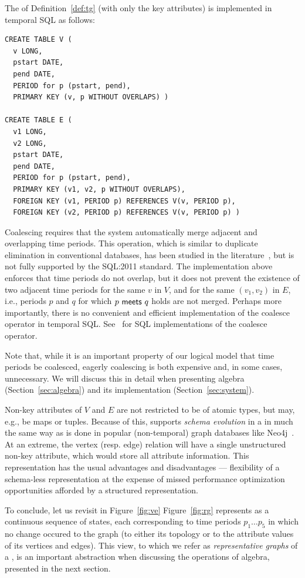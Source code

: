 The \tg of Definition~\ref{def:tg} (with only the key attributes) is
implemented in temporal SQL as follows:

\begin{small}
\begin{verbatim}
CREATE TABLE V (
  v LONG,
  pstart DATE,
  pend DATE,
  PERIOD for p (pstart, pend),
  PRIMARY KEY (v, p WITHOUT OVERLAPS) )

CREATE TABLE E (
  v1 LONG,
  v2 LONG,
  pstart DATE,
  pend DATE,
  PERIOD for p (pstart, pend),
  PRIMARY KEY (v1, v2, p WITHOUT OVERLAPS),
  FOREIGN KEY (v1, PERIOD p) REFERENCES V(v, PERIOD p),
  FOREIGN KEY (v2, PERIOD p) REFERENCES V(v, PERIOD p) )
\end{verbatim}
\end{small}

Coalescing requires that the system automatically merge adjacent and
overlapping time periods.  This operation, which is similar to
duplicate elimination in conventional databases, has been studied in
the
literature~\cite{DBLP:conf/vldb/BohlenSS96,DBLP:journals/sigmod/Zimanyi06},
but is not fully supported by the SQL:2011 standard.  The
implementation above enforces that time periods do not overlap, but it
does not prevent the existence of two adjacent time periods for the
same $v$ in $V$, and for the same $(v_1, v_2)$ in $E$, i.e., periods
$p$ and $q$ for which $p~\mathsf{meets}~q$ holds are not merged.
Perhaps more importantly, there is no convenient and efficient
implementation of the coalesce operator in temporal SQL.
See~\cite{DBLP:reference/db/Bohlen09} for SQL implementations of the
coalesce operator.

Note that, while it is an important property of our logical model that
time periods be coalesced, eagerly coalescing is both expensive and,
in some cases, unnecessary.  We will discuss this in detail when
presenting \tg algebra (Section~\ref{sec:algebra}) and its
implementation (Section~\ref{sec:system}).

Non-key attributes of $V$ and $E$ are not restricted to be of atomic
types, but may, e.g., be maps or tuples.  Because of this, \ql
supports {\em schema evolution} in a \tg in much the same way as is
done in popular (non-temporal) graph databases like Neo4j~\cite{}.  At
an extreme, the vertex (resp. edge) relation will have a single
unstructured non-key attribute, which would store all attribute
information.  This representation has the usual advantages and
disadvantages --- flexibility of a schema-less representation at the
expense of missed performance optimization opportunities afforded by a
structured representation.

To conclude, let us revisit \tg {} in Figure~\ref{fig:ve}
Figure~\ref{fig:rg} represents  as a continuous sequence of
states, each corresponding to time periods $p_1 \ldots p_5$ in which
no change occured to the graph (to either its topology or to the
attribute values of its vertices and edges).  This view, to which we
refer as {\em representative graphs} of a \tg, is an important
abstraction when discussing the operations of \tg algebra, presented
in the next section.
